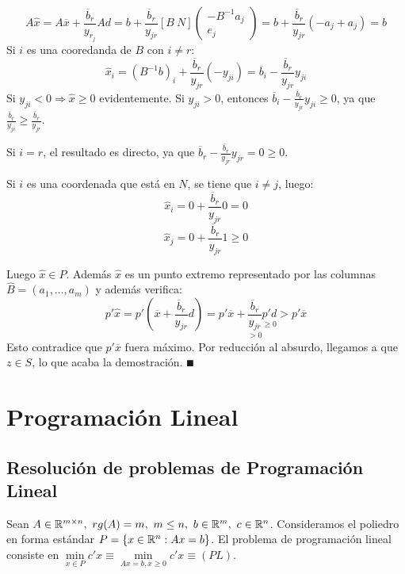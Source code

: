 \documentclass[PM.tex]{subfiles}
\begin{document}
\begin{dem}
\begin{itemize}
	\[ A\hat{x} = A\overline{x} + \frac{\overline{b}_r}{y_{r_j}} A d = b + \frac{\overline{b}_r}{y_{jr}} [B\ N] \begin{pmatrix}-B^{-1}a_j\\e_j\end{pmatrix} = b + \frac{\overline{b}_r}{y_{jr}}(-a_j + a_j) = b \]
	Si $i$ es una cooredanda de $B$ con $i \neq r$:
	\[ \hat{x}_i = (B^{-1}b)_i + \frac{\overline{b}_r}{y_{jr}}(-y_{ji}) = \overline{b}_i - \frac{\overline{b}_r}{y_{jr}}y_{ji} \]
	Si $y_{ji} < 0 \Rightarrow \hat{x} ≥ 0$ evidentemente. Si $y_{ji} > 0$, entonces $\overline{b}_i - \frac{\overline{b}_r}{y_{jr}}y_{ji} ≥ 0$, ya que $ \frac{\overline{b}_r}{y_{ji}} ≥ \frac{\overline{b}_r}{y_{jr}}$.
	
	Si $i = r$, el resultado es directo, ya que $\overline{b}_r - \frac{\overline{b}_r}{y_{jr}}y_{jr} = 0 ≥ 0$.
	
	Si $i$ es una coordenada que está en $N$, se tiene que $i \neq j$, luego:
	\[ \hat{x}_i = 0 +  \frac{\overline{b}_r}{y_{jr}}0 = 0 \]
	\[ \hat{x}_j = 0 +  \frac{\overline{b}_r}{y_{jr}}1 ≥ 0 \]
	
	Luego $\hat{x} \in P$. Además $\hat{x}$ es un punto extremo representado por las columnas $\hat{B}= (a_1,\dots,a_m)$ y además verifica:
	\[ p'\hat{x} = p'(\overline{x} + \frac{\overline{b}_r}{y_{jr}}d) = p'\overline{x} + \underset{>0}{\frac{\overline{b}_r}{y_{jr}}} \underset{≥0}{p'd} > p'\overline{x} \]
	Esto contradice que $p'\overline{x}$ fuera máximo. Por reducción al absurdo, llegamos a que $z \in S$, lo que acaba la demostración.
	$\QED$
\end{itemize}
\end{dem}

\chapter{Programación Lineal} %

\section{Resolución de problemas de Programación Lineal}

Sean $A\in\mathbb{R}^{m\times n},\ rg(A)=m,\ m\leq n,\ b\in\mathbb{R}^m,\ c\in\mathbb{R}^n$. Consideramos el poliedro en forma estándar $P=\{x\in\mathbb{R}^n: Ax=b\}$. El problema de programación lineal consiste en $\underset{x\in P}{\min} c'x \equiv \underset{Ax=b,x\geq 0}{\min} c'x\equiv (PL)$. 
\end{document}
